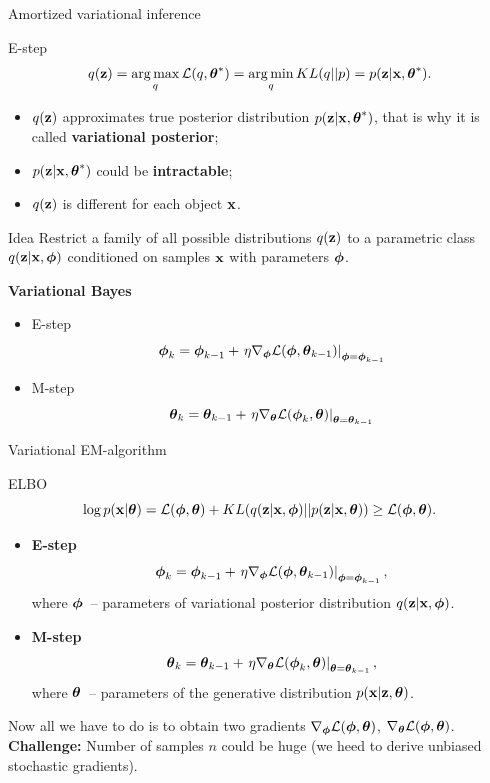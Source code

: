 \begin{frame}{Amortized variational inference}
    \begin{block}{E-step}
	    \vspace{-0.3cm}
	    \[
			q(\mathbf{z}) = \operatorname*{arg\,max}_q \mathcal{L} (q, \boldsymbol{\theta}^*) = \operatorname*{arg\,min}_q KL(q || p) =
			 p(\mathbf{z}| \mathbf{x}, \boldsymbol{\theta}^*).
		\]
		\vspace{-0.3cm}
		\begin{itemize}
			\item $q(\mathbf{z})$ approximates true posterior distribution $p(\mathbf{z}| \mathbf{x}, \boldsymbol{\theta}^*)$, that is why it is called \textbf{variational posterior};
			\item $p(\mathbf{z}| \mathbf{x}, \boldsymbol{\theta}^*)$ could be \textbf{intractable};
			\item $q(\mathbf{z})$ is different for each object $\mathbf{x}$.
		\end{itemize}
		\vspace{-0.3cm}
    \end{block}
	\begin{block}{Idea}
	Restrict a family of all possible distributions $q(\mathbf{z})$ to a parametric class $q(\mathbf{z}|\mathbf{x}, \boldsymbol{\phi})$ conditioned on samples $\mathbf{x}$ with parameters $\boldsymbol{\phi}$.
	\end{block}
	
	\textbf{Variational Bayes}
	\begin{itemize}
		\item E-step
		\[
		\boldsymbol{\phi}_k = \boldsymbol{\phi}_{k-1} + \left.\eta \nabla_{\boldsymbol{\phi}} \mathcal{L}(\boldsymbol{\phi}, \boldsymbol{\theta}_{k-1})\right|_{\boldsymbol{\phi}=\boldsymbol{\phi}_{k-1}}
		\]
		\item M-step
		\[
		\boldsymbol{\theta}_k = \boldsymbol{\theta}_{k-1} + \left.\eta \nabla_{\boldsymbol{\theta}} \mathcal{L}(\boldsymbol{\phi}_k, \boldsymbol{\theta})\right|_{\boldsymbol{\theta}=\boldsymbol{\theta}_{k-1}}
		\]
	\end{itemize}
\end{frame}
\begin{frame}{Variational EM-algorithm}
	\begin{block}{ELBO}
		\vspace{-0.5cm}
		\[
			\log p(\mathbf{x}| \boldsymbol{\theta}) = \mathcal{L} (\boldsymbol{\phi}, \boldsymbol{\theta}) + KL(q(\mathbf{z} | \mathbf{x}, \boldsymbol{\phi}) || p(\mathbf{z}|\mathbf{x}, \boldsymbol{\theta})) \geq \mathcal{L} (\boldsymbol{\phi}, \boldsymbol{\theta}).
		\]
		\vspace{-0.5cm}
	\end{block}
	\begin{itemize}
		\item \textbf{E-step}
		\[
		\boldsymbol{\phi}_k = \boldsymbol{\phi}_{k-1} + \left.\eta \nabla_{\boldsymbol{\phi}} \mathcal{L}(\boldsymbol{\phi}, \boldsymbol{\theta}_{k-1})\right|_{\boldsymbol{\phi}=\boldsymbol{\phi}_{k-1}},
		\]
		where $\boldsymbol{\phi}$~-- parameters of variational posterior distribution $q(\mathbf{z} | \mathbf{x}, \boldsymbol{\phi})$.
		\item \textbf{M-step}
		\[
		\boldsymbol{\theta}_k = \boldsymbol{\theta}_{k-1} + \left.\eta \nabla_{\boldsymbol{\theta}} \mathcal{L}(\boldsymbol{\phi}_k, \boldsymbol{\theta})\right|_{\boldsymbol{\theta}=\boldsymbol{\theta}_{k-1}},
		\]
		where $\boldsymbol{\theta}$~-- parameters of the generative distribution $p(\mathbf{x} | \mathbf{z}, \boldsymbol{\theta})$.
	\end{itemize}
	Now all we have to do is to obtain two gradients $\nabla_{\boldsymbol{\phi}} \mathcal{L}(\boldsymbol{\phi}, \boldsymbol{\theta})$, $\nabla_{\boldsymbol{\theta}} \mathcal{L}(\boldsymbol{\phi}, \boldsymbol{\theta})$.  \\
	\textbf{Challenge:} Number of samples $n$ could be huge (we heed to derive unbiased stochastic gradients).
\end{frame}
